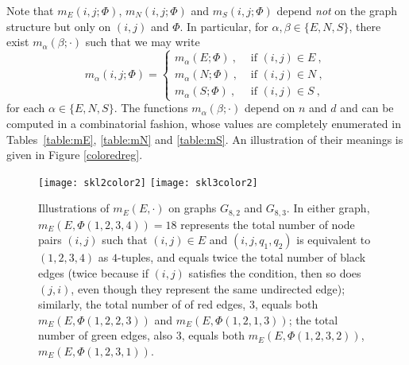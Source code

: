 \documentclass{article}
\begin{document}
Note that $m_E(i, j; \Phi)$, $m_N(i, j; \Phi)$ and $m_S(i, j; \Phi)$ depend \emph{not} on the graph structure but only on $(i, j)$ and $\Phi$. In particular, for $\alpha, \beta \in \{E, N, S\}$, there exist $m_\alpha(\beta; \cdot)$ such that we may write
\begin{equation}
\label{eq:m}
    m_\alpha(i, j; \Phi) = \begin{cases}
        m_\alpha(E; \Phi)~,& \text{ if } (i, j) \in E~, \\
        m_\alpha(N; \Phi)~,& \text{ if } (i, j) \in N~, \\
        m_\alpha(S; \Phi)~,& \text{ if } (i, j) \in S~,
    \end{cases}
\end{equation}
for each $\alpha \in \{E, N, S\}$. The functions $m_\alpha(\beta; \cdot)$ depend on $n$ and $d$ and can be computed in a combinatorial fashion, whose values are completely enumerated in 
Tables~\ref{table:mE}, \ref{table:mN} and \ref{table:mS}. An illustration of their meanings is given in Figure \ref{coloredreg}.
\begin{figure}
\label{coloredreg}
    \centering
    \texttt{[image: skl2color2]}
    \texttt{[image: skl3color2]}
    \caption{
    Illustrations of 
$m_E(E, \cdot)$
    on graphs $G_{8, 2} $ and $G_{8, 3}$. In either graph, $m_E(E, \Phi(1, 2, 3, 4)) = 18$ represents the total number of node pairs $(i, j)$ such that $(i, j) \in E$ and $(i, j, q_1, q_2)$ is equivalent to $(1, 2, 3, 4)$ as $4$-tuples, and equals twice the total number of black edges (twice because if $(i, j)$ satisfies the condition, then so does $(j, i)$, even though they represent the same undirected edge); similarly, the total number of of red edges, $3$, equals both $m_E(E, \Phi(1, 2, 2, 3))$ and $m_E(E, \Phi(1, 2, 1, 3))$; the total number of green edges, also $3$, equals both $m_E(E, \Phi(1, 2, 3, 2))$, $m_E(E, \Phi(1, 2, 3, 1))$.}
    \label{fig:my_label}
\end{figure}
\end{document}
